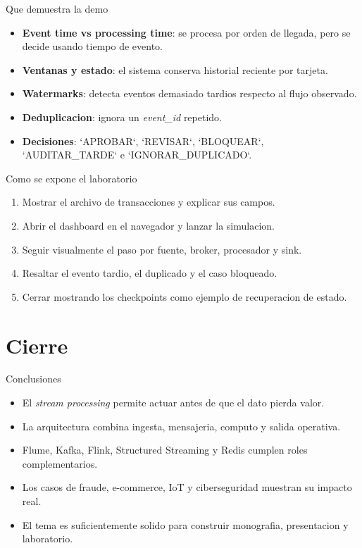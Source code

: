 \documentclass[aspectratio=169]{beamer}
\begin{document}
\begin{frame}{Que demuestra la demo}
  \begin{itemize}
    \item \textbf{Event time vs processing time}: se procesa por orden de llegada, pero se decide usando tiempo de evento.
    \item \textbf{Ventanas y estado}: el sistema conserva historial reciente por tarjeta.
    \item \textbf{Watermarks}: detecta eventos demasiado tardios respecto al flujo observado.
    \item \textbf{Deduplicacion}: ignora un \textit{event\_id} repetido.
    \item \textbf{Decisiones}: `APROBAR`, `REVISAR`, `BLOQUEAR`, `AUDITAR\_TARDE` e `IGNORAR\_DUPLICADO`.
  \end{itemize}
\end{frame}

\begin{frame}{Como se expone el laboratorio}
  \begin{enumerate}
    \item Mostrar el archivo de transacciones y explicar sus campos.
    \item Abrir el dashboard en el navegador y lanzar la simulacion.
    \item Seguir visualmente el paso por fuente, broker, procesador y sink.
    \item Resaltar el evento tardio, el duplicado y el caso bloqueado.
    \item Cerrar mostrando los checkpoints como ejemplo de recuperacion de estado.
  \end{enumerate}
\end{frame}

\section{Cierre}

\begin{frame}{Conclusiones}
  \begin{itemize}
    \item El \textit{stream processing} permite actuar antes de que el dato pierda valor.
    \item La arquitectura combina ingesta, mensajeria, computo y salida operativa.
    \item Flume, Kafka, Flink, Structured Streaming y Redis cumplen roles complementarios.
    \item Los casos de fraude, e-commerce, IoT y ciberseguridad muestran su impacto real.
    \item El tema es suficientemente solido para construir monografia, presentacion y laboratorio.
  \end{itemize}
\end{frame}
\end{document}
